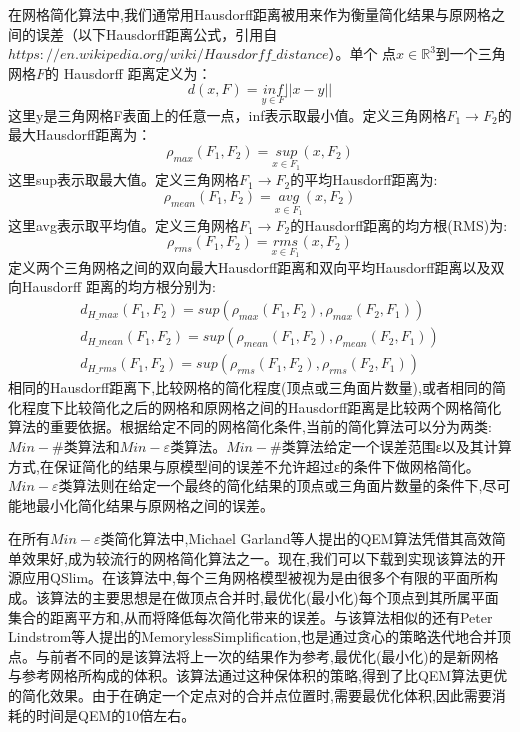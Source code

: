 在网格简化算法中,我们通常用Hausdorff距离被用来作为衡量简化结果与原网格之间的误差（以下Hausdorff距离公式，引用自$https://en.wikipedia.org/wiki/Hausdorff\_distance$）。单个
点$x\in\mathbb{R}^3$到一个三角网格$F$的 Hausdorff 距离定义为：
\begin{equation}
  d(x, F) = \underset{y\in F}{inf}||x-y||
  \label{eq:v2f-haus}
\end{equation}
这里y是三角网格F表面上的任意一点，inf表示取最小值。定义三角网格$F_1 \to F_2$的最大Hausdorff距离为：
\begin{equation}
  \rho_{max}(F_1,F_2)=\underset{x\in F_1}{sup}(x,F_2)
  \label{eq:f2f-max-haus}
\end{equation}
这里sup表示取最大值。定义三角网格$F_1 \to F_2$的平均Hausdorff距离为:
\begin{equation}
  \rho_{mean}(F_1,F_2)=\underset{x\in F_1}{avg}(x,F_2)
  \label{eq:f2f-mean-haus}
\end{equation}
这里avg表示取平均值。定义三角网格$F_1 \to F_2$的Hausdorff距离的均方根(RMS)为:
\begin{equation}
  \rho_{rms}(F_1,F_2)=\underset{x\in F_1}{rms}(x,F_2)
  \label{eq:f2f-rms-haus}
\end{equation}
定义两个三角网格之间的双向最大Hausdorff距离和双向平均Hausdorff距离以及双向Hausdorff 距离的均方根分别为:
\begin{equation}
  \begin{array}{l}
    d_{H\_max}(F_1,F_2)=sup(\rho_{max}(F_1,F_2), \rho_{max}(F_2,F_1))\\
    d_{H\_mean}(F_1,F_2)=sup(\rho_{mean}(F_1,F_2), \rho_{mean}(F_2,F_1))\\
    d_{H\_rms}(F_1,F_2)=sup(\rho_{rms}(F_1,F_2), \rho_{rms}(F_2,F_1))
  \end{array}
  \label{eq:ff-haus}
\end{equation}
相同的Hausdorff距离下,比较网格的简化程度(顶点或三角面片数量),或者相同的简化程度下比较简化之后的网格和原网格之间的Hausdorff距离是比较两个网格简化算法的重要依据。根据给定不同的网格简化条件,当前的简化算法可以分为两类:$Min−\#$类算法和$Min−\varepsilon$类算法。$Min−\#$类算法给定一个误差范围ε以及其计算方式,在保证简化的结果与原模型间的误差不允许超过ε的条件下做网格简化。$Min−\varepsilon$类算法则在给定一个最终的简化结果的顶点或三角面片数量的条件下,尽可能地最小化简化结果与原网格之间的误差。\par
在所有$Min−\varepsilon$类简化算法中,Michael Garland等人提出的QEM算法\cite{qem}凭借其高效简单效果好,成为较流行的网格简化算法之一。现在,我们可以下载到实现该算法的开源应用QSlim。在该算法中,每个三角网格模型被视为是由很多个有限的平面所构成。该算法的主要思想是在做顶点合并时,最优化(最小化)每个顶点到其所属平面集合的距离平方和,从而将降低每次简化带来的误差。与该算法相似的还有Peter Lindstrom等人提出的MemorylessSimplification,也是通过贪心的策略迭代地合并顶点。与前者不同的是该算法将上一次的结果作为参考,最优化(最小化)的是新网格与参考网格所构成的体积。该算法通过这种保体积的策略,得到了比QEM算法更优的简化效果。由于在确定一个定点对的合并点位置时,需要最优化体积,因此需要消耗的时间是QEM的10倍左右。\par

